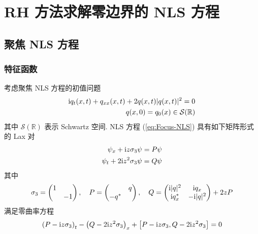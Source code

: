 \chapter{RH 方法求解零边界的 NLS 方程}
\section{聚焦 NLS 方程}
\subsection{特征函数}

考虑聚焦 NLS 方程的初值问题 
\begin{align}
\mathrm{i} q_{t}(x,t) + q_{xx}(x,t) + 2q(x,t)|q(x,t)|^{2} = 0 \label{eq:Focus-NLS}\\
q(x,0) = q_{0}(x) \in \mathcal{S}(\mathbb{R}) 
\end{align}
其中 $ \mathcal{S}(\mathbb{R}) $ 表示 Schwartz 空间. 
NLS 方程 (\ref{eq:Focus-NLS}) 具有如下矩阵形式的 Lax 对 
\begin{align}
  \psi_{x} + \mathrm{i} z \sigma_{3} \psi = P \psi \label{eq:Focus-NLS-Lax-x}\\
  \psi_{t} + 2 \mathrm{i} z^2 \sigma_{3} \psi = Q \psi \label{eq:Focus-NLS-Lax-t}
\end{align}
其中 
\begin{equation*}
  \sigma_{3} = \begin{pmatrix}
    1 & \\ & -1
  \end{pmatrix}, \quad
  P = \begin{pmatrix}
    & q \\ -q^{*} & 
  \end{pmatrix}, \quad
  Q = \begin{pmatrix}
    \mathrm{i} |q|^2 & \mathrm{i} q_{x} \\ \mathrm{i} q_{x}^{*} & -\mathrm{i} |q|^2
  \end{pmatrix} + 2 z P
\end{equation*}
满足零曲率方程
\begin{equation}
  \left(P - \mathrm{i} z \sigma_{3}\right)_{t} - \left(Q - 2 \mathrm{i} z^2 \sigma_{3}\right)_{x} + \left[P - \mathrm{i} z \sigma_{3}, Q - 2 \mathrm{i} z^2 \sigma_{3} \right] = 0
\end{equation}


